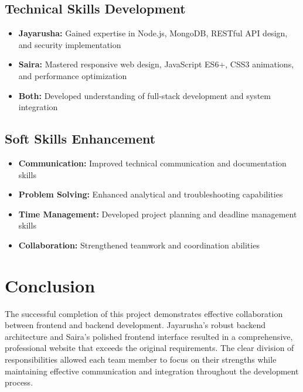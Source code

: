 \documentclass[12pt,a4paper]{report}
\begin{document}
\subsection{Technical Skills Development}
\begin{itemize}
    \item \textbf{Jayarusha:} Gained expertise in Node.js, MongoDB, RESTful API design, and security implementation
    \item \textbf{Saira:} Mastered responsive web design, JavaScript ES6+, CSS3 animations, and performance optimization
    \item \textbf{Both:} Developed understanding of full-stack development and system integration
\end{itemize}

\subsection{Soft Skills Enhancement}
\begin{itemize}
    \item \textbf{Communication:} Improved technical communication and documentation skills
    \item \textbf{Problem Solving:} Enhanced analytical and troubleshooting capabilities
    \item \textbf{Time Management:} Developed project planning and deadline management skills
    \item \textbf{Collaboration:} Strengthened teamwork and coordination abilities
\end{itemize}

\section{Conclusion}
The successful completion of this project demonstrates effective collaboration between frontend and backend development. Jayarusha's robust backend architecture and Saira's polished frontend interface resulted in a comprehensive, professional website that exceeds the original requirements. The clear division of responsibilities allowed each team member to focus on their strengths while maintaining effective communication and integration throughout the development process.
\end{document}
